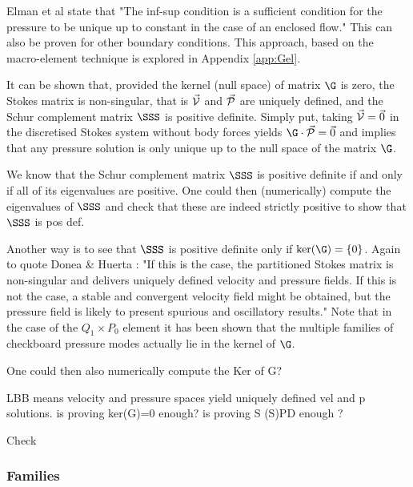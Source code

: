 Elman et al \cite{elsw} state that "The inf-sup condition is a sufficient condition for the pressure to be unique up
to  constant in the case of an enclosed flow." This can also be proven for other boundary conditions.
This approach, based on the macro-element technique \cite{sten90} is explored in Appendix \ref{app:Gel}.


It can be shown that, provided the kernel (null space) of matrix $\G$ is zero,
the Stokes matrix is non-singular, that is $\vec{\cal V}$ and $\vec{\cal P}$ 
are uniquely defined, and the Schur complement matrix $\SSS$ is positive definite. 
Simply put, taking $\vec{\cal V}=\vec{0}$ in the discretised Stokes system 
without body forces yields $\G \cdot \vec{\cal P}=\vec{0}$ and implies
that any pressure solution is only unique up to the null space of the matrix $\G$.

We know that the Schur complement matrix $\SSS$ is positive definite if and only if all of its eigenvalues are positive.
One could then (numerically) compute the eigenvalues of $\SSS$ and check that these are indeed strictly positive
to show that $\SSS$ is pos def. 


Another way is to see that $\SSS$ is positive definite only if $\text{ker}(\G)=\{0\}$.
Again to quote Donea \& Huerta \cite{dohu03}: "If this is the case, the partitioned Stokes matrix  
is non-singular and delivers uniquely defined velocity and pressure fields. If this is not the case, a
stable and convergent velocity field might be obtained, but the pressure field is likely
to present spurious and oscillatory results." 
Note that in the case of the $Q_1 \times P_0$ element it has been shown that the multiple families of 
checkboard pressure modes actually lie in the kernel of $\G$. \cite{XXXXsani}

One could then also numerically compute the Ker of G?

\vspace{.4cm}

LBB means velocity and pressure spaces yield uniquely defined vel and p solutions. 
is proving ker(G)=0 enough? is proving S (S)PD enough ?

Check \cite{chba93}


\subsubsection{Families}

